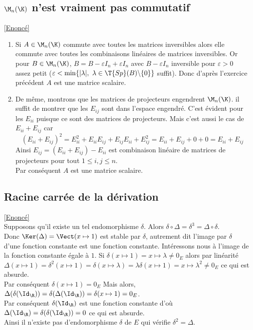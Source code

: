 \documentclass[8pt]{book}
\begin{document}
	\subsection{$\M_n(\K)$ n'est vraiment pas commutatif}
	\label{Mn(K) n'est vraiment pas commutatif}
	\textcolor{blue}{\hyperref[Mn(K) n'est vraiment pas commutatif corrigé]{[Enoncé]}}\\
	\begin{enumerate}[leftmargin=*]
		\item Si $A\in \M_n(\K)$ commute avec toutes les matrices inversibles alors elle commute avec toutes les combinaisons linéaires de matrices inversibles. Or pour $B\in \M_n(\K)$, $B=B-\varepsilon I_n+\varepsilon I_n$ avec $B-\varepsilon I_n$ inversible pour $\varepsilon>0$ assez petit ($\varepsilon<\min\{|\lambda|,\ \lambda\in \T{Sp}(B)\backslash\{0\}\}$ suffit). Donc d'après l'exercice précédent $A$ est une matrice scalaire.
		\item De même, montrons que les matrices de projecteurs engendrent $\M_n(\K)$. il suffit de montrer que les $E_{ij}$ sont dans l'espace engendré. C'est évident pour les $E_{ii}$ puisque ce sont des matrices de projecteurs. Mais c'est aussi le cas de $E_{ii}+E_{ij}$ car $$(E_{ii}+E_{ij})^2=E_{ii}^2+E_{ii}E_{ij}+E_{ij}E_{ii}+E_{ij}^2=E_{ii}+E_{ij}+0+0=E_{ii}+E_{ij}$$
		Ainsi $E_{ij}=(E_{ii}+E_{ij})-E_{ii}$ est combinaison linéaire de matrices de projecteurs pour tout $1\leq i,j\leq n$.\\
		Par conséquent $A$ est une matrice scalaire.
	\end{enumerate}
	
	\subsection{Racine carrée de la dérivation }
	\label{Racine carrée de la dérivation corrigé}
	\textcolor{blue}{\hyperref[Racine carrée de la dérivation]{[Enoncé]}}\\
	Supposons qu'il existe un tel endomorphisme $\delta$. Alors $\delta\circ\Delta=\delta^3=\Delta\circ\delta$.\\
	Donc $\Ker(\Delta)=\Vect(x\mapsto 1)$ est stable par $\delta$, autrement dit l'image par $\delta$ d'une fonction constante est une fonction constante. Intéressons nous à l'image de la fonction constante égale à $1$. Si $\delta(x\mapsto 1)=x\mapsto \lambda\ne 0_E$ alors par linéarité $\Delta(x\mapsto 1)=\delta^2(x\mapsto 1)=\delta(x\mapsto \lambda)=\lambda\delta(x\mapsto 1)=x\mapsto \lambda^2\ne 0_E$ ce qui est absurde.\\
	Par conséquent $\delta(x\mapsto 1)=0_E$ Mais alors, $\Delta(\delta(\Id_\R))=\delta(\Delta(\Id_\R))=\delta(x\mapsto 1)=0_E$.\\
	Par conséquent $\delta(\Id_\R)$ est une fonction constante d'où $\Delta(\Id_\R)=\delta(\delta(\Id_\R))=0$ ce qui est absurde.\\
	Ainsi il n'existe pas d'endomorphisme $\delta$ de $E$ qui vérifie $\delta^2=\Delta$.
	
\end{document}
